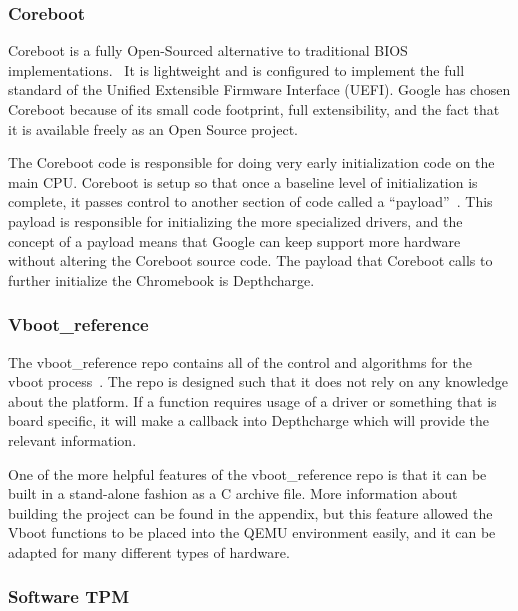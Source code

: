 \documentclass[../report.tex]{subfiles}
\begin{document}
\subsubsection{Coreboot}\label{coreboot}

Coreboot is a fully Open-Sourced alternative to traditional BIOS implementations.~\cite{coreboot}
It is lightweight and is configured to implement the full standard of the Unified Extensible Firmware Interface (UEFI).
Google has chosen Coreboot because of its small code footprint, full extensibility, and the fact that it is available freely as an Open Source project.

The Coreboot code is responsible for doing very early initialization code on the main CPU\@. 
Coreboot is setup so that once a baseline level of initialization is complete, it passes control to another section of code called a ``payload''~\cite{coreboot-payload}.
This payload is responsible for initializing the more specialized drivers, and the concept of a payload means that Google can keep support more hardware without altering the Coreboot source code.
The payload that Coreboot calls to further initialize the Chromebook is Depthcharge.

\subsubsection{Vboot\_reference}

The vboot\_reference repo contains all of the control and algorithms for the vboot process~\cite{vboot-codebase}.
The repo is designed such that it does not rely on any knowledge about the platform.
If a function requires usage of a driver or something that is board specific, it will make a callback into Depthcharge which will provide the relevant information.

One of the more helpful features of the vboot\_reference repo is that it can be
built in a stand-alone fashion as a C archive file.
More information about building the project can be found in the appendix, but
this feature allowed the Vboot functions to be placed into the QEMU environment
easily, and it can be adapted for many different types of hardware.

\subsubsection{Software TPM}
\end{document}

